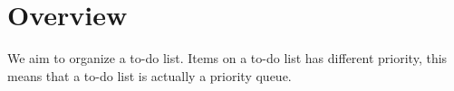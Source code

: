 \section{Overview}

We aim to organize a to-do list.
Items on a to-do list has different priority, this means that a to-do list is 
actually a priority queue.


